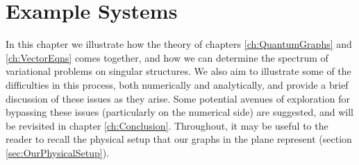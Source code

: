 \chapter{Example Systems} \label{ch:ExampleSystems}
In this chapter we illustrate how the theory of chapters \ref{ch:QuantumGraphs} and \ref{ch:VectorEqns} comes together, and how we can determine the spectrum of variational problems on singular structures.
We also aim to illustrate some of the difficulties in this process, both numerically and analytically, and provide a brief discussion of these issues as they arise.
Some potential avenues of exploration for bypassing these issues (particularly on the numerical side) are suggested, and will be revisited in chapter \ref{ch:Conclusion}.
Throughout, it may be useful to the reader to recall the physical setup that our graphs in the plane represent (section \ref{sec:OurPhysicalSetup}).

